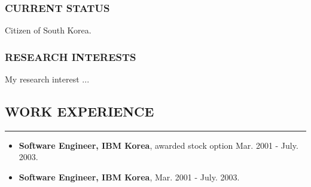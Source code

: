 \documentclass[10pt,a4]{article}
\begin{document}
\begin{small}
\subsubsection*{CURRENT STATUS}
\begin{list}{}{}
\item Citizen of South Korea.
\end{list}

\subsubsection*{RESEARCH INTERESTS}

\begin{list}{}{}
\item My research interest ...
\end{list}

\subsection*{WORK EXPERIENCE}
\hrule
\vspace{0.2cm}
\begin{itemize}
\item {\bf Software Engineer, IBM Korea}, awarded stock option Mar. 2001 - July. 2003. \\
\item {\bf Software Engineer, IBM Korea}, Mar. 2001 - July. 2003. \\


\end{itemize}


\end{small}
\end{document}

